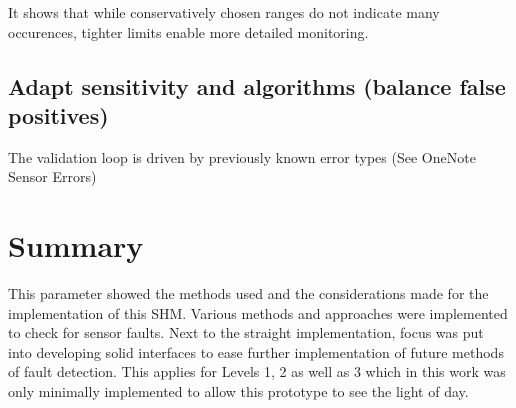 It shows that while conservatively chosen ranges do not indicate many occurences, tighter limits enable more detailed monitoring.

\subsection{Adapt sensitivity and algorithms (balance false positives)}

The validation loop is driven by previously known error types (See OneNote Sensor Errors)


\section{Summary}

This parameter showed the methods used and the considerations made for the implementation of this SHM. Various methods and approaches were implemented to check for sensor faults. Next to the straight implementation, focus was put into developing solid interfaces to ease further implementation of future methods of fault detection. This applies for Levels 1, 2 as well as 3 which in this work was only minimally implemented to allow this prototype to see the light of day.





